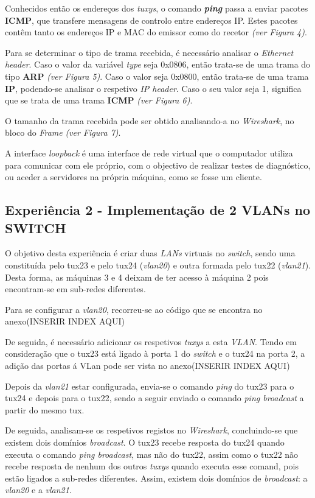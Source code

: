 \documentclass[11pt]{article}
\begin{document}
Conhecidos então os endereços dos \textit{tuxys}, o comando \textit{\textbf{ping}} passa a enviar pacotes \textbf{ICMP}, que transfere mensagens de controlo entre endereços IP. Estes pacotes contêm tanto os endereços IP e MAC do emissor como do recetor \textit{(ver Figura 4)}.

Para se determinar o tipo de trama recebida, é necessário analisar o \textit{Ethernet header}. Caso o valor da variável \textit{type} seja 0x0806, então trata-se de uma trama do tipo \textbf{ARP} \textit{(ver Figura 5)}. Caso o valor seja 0x0800, então trata-se de uma trama \textbf{IP}, podendo-se analisar o respetivo \textit{IP header}. Caso o seu valor seja 1, significa que se trata de uma trama \textbf{ICMP} \textit{(ver Figura 6)}.

O tamanho da trama recebida pode ser obtido analisando-a no \textit{Wireshark}, no bloco do \textit{Frame} \textit{(ver Figura 7)}.

A interface \textit{loopback} é uma interface de rede virtual que o computador utiliza para comunicar com ele próprio, com o objectivo de realizar testes de diagnóstico, ou aceder a servidores na própria máquina, como se fosse um cliente.

\subsection{Experiência 2 - Implementação de 2 VLANs no SWITCH}

O objetivo desta experiência é criar duas \textit{LANs} virtuais no \textit{switch}, sendo uma constituída pelo tux23 e pelo tux24 (\textit{vlan20}) e outra formada pelo tux22 (\textit{vlan21}). Desta forma, as máquinas 3 e 4 deixam de ter acesso à máquina 2 pois encontram-se em sub-redes diferentes.

Para se configurar a \textit{vlan20}, recorreu-se ao código que se encontra no anexo(INSERIR INDEX AQUI) 

De seguida, é necessário adicionar os respetivos \textit{tuxys} a esta \textit{VLAN}. Tendo em consideração que o tux23 está ligado à porta 1 do \textit{switch} e o tux24 na porta 2, a adição das portas á VLan pode ser vista no anexo(INSERIR INDEX AQUI) 

Depois da \textit{vlan21} estar configurada, envia-se o comando \textit{ping} do tux23 para o tux24 e depois para o tux22, sendo a seguir enviado o comando \textit{ping broadcast} a partir do mesmo tux.

De seguida, analisam-se os respetivos registos no \textit{Wireshark}, concluindo-se que existem dois domínios \textit{broadcast}. O tux23 recebe resposta do tux24 quando executa o comando \textit{ping broadcast}, mas não do tux22, assim como o tux22 não recebe resposta de nenhum dos outros \textit{tuxys} quando executa esse comand, pois estão ligados a sub-redes diferentes. Assim, existem dois domínios de \textit{broadcast}: a \textit{vlan20} e a \textit{vlan21}. 
\end{document}
